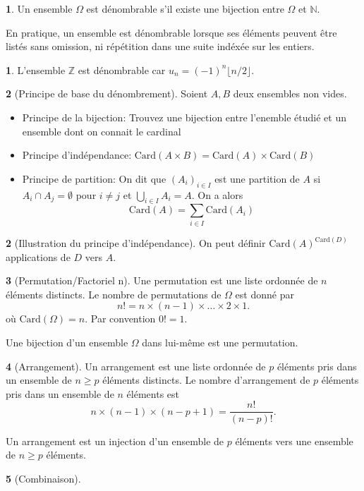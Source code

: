 \documentclass[8pt,notheorems]{beamer}
\def \N{\mathbb N}
\def \Z{\mathbb Z}
\theoremstyle{definition}
\newtheorem{definition}{\translate{Definition}}
\theoremstyle{example}
\newtheorem{example}{\translate{Example}}
\theoremstyle{mystyle}
\theoremstyle{plain}
\begin{document}
\begin{frame}[allowframebreaks]
\begin{definition}
Un ensemble $\Omega$ est dénombrable s'il existe une bijection entre $\Omega$ et $\N$.
\end{definition}
En pratique, un ensemble est dénombrable lorsque ses éléments peuvent être listés sans omission, ni répétition dans une suite indéxée sur les entiers. 
\begin{example}
L'ensemble $\Z$ est dénombrable car $u_n = (-1)^n\lfloor n /2\rfloor$.
\end{example}
\begin{definition}[Principe de base du dénombrement]
Soient $A,B$ deux ensembles non vides.
\begin{itemize}
    \item Principe de la bijection: Trouvez une bijection entre l'enemble étudié et un ensemble dont on connait le cardinal
    \item Principe d'indépendance: $\text{Card}(A\times B)= \text{Card}(A)\times \text{Card}(B)$ 
    \item Principe de partition: On dit que $(A_i)_{i\in I}$ est une partition de $A$ si $A_i\cap A_j = \emptyset$ pour $i\neq j$ et $\bigcup_{i\in I}A_i = A$. On a alors 
    $$
    \text{Card}(A)= \sum_{i\in I}\text{Card}(A_i)
    $$
\end{itemize}
\end{definition}
\begin{example}[Illustration du principe d'indépendance]
On peut définir $\text{Card}(A)^{\text{Card}(D)}$ applications de $D$ vers $A$.
\end{example}
\begin{definition}[Permutation/Factoriel n]
Une permutation est une liste ordonnée de $n$ éléments distincts. Le nombre de permutations de $\Omega$ est donné par 
$$
n! = n\times(n-1)\times\ldots\times2\times 1.
$$
où $\text{Card}(\Omega) = n$. Par convention $0! = 1$.   
\end{definition}
Une bijection d'un ensemble $\Omega$ dans lui-même est une permutation.
\begin{definition}[Arrangement]
Un arrangement est une liste ordonnée de $p$ éléments pris dans un ensemble de $n\geq p$ éléments distincts. Le nombre d'arrangement de $p$ éléments pris dans un ensemble de $n$ éléments est 
$$
n\times (n-1)\times (n-p+1) = \frac{n!}{(n-p)!}.
$$
\end{definition}
Un arrangement est un injection d'un ensemble de $p$ éléments vers une ensemble de $n\geq p$ éléments.
\begin{definition}[Combinaison]

\end{definition}
\end{frame}
\end{document}
